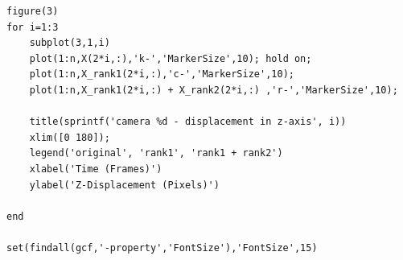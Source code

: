\documentclass{article}
\begin{document}
\begin{appendices}
\begin{verbatim}
figure(3)
for i=1:3
    subplot(3,1,i)
    plot(1:n,X(2*i,:),'k-','MarkerSize',10); hold on;
    plot(1:n,X_rank1(2*i,:),'c-','MarkerSize',10); 
    plot(1:n,X_rank1(2*i,:) + X_rank2(2*i,:) ,'r-','MarkerSize',10);  

    title(sprintf('camera %d - displacement in z-axis', i))
    xlim([0 180]);
    legend('original', 'rank1', 'rank1 + rank2')
    xlabel('Time (Frames)')
    ylabel('Z-Displacement (Pixels)')

end

set(findall(gcf,'-property','FontSize'),'FontSize',15)


\end{verbatim}


\end{appendices}
\end{document}
